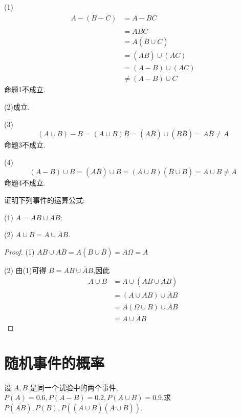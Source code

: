 \begin{solution}
    (1)
    $$
    \begin{aligned}
        A-(B-C) &= A - B \overline{C} \\
        &= A \overline{B \overline{C}} \\
        &= A (\overline{B} \cup C) \\
        &= (A \overline{B}) \cup (AC) \\
        &= (A-B) \cup (AC) \\
        & \not= (A-B) \cup C
    \end{aligned}
    $$
    命题1不成立.

    (2)成立.

    (3)
    $$
    (A \cup B) - B = (A \cup B) \overline{B} = (A \overline{B}) \cup (B \overline{B}) = A \overline{B} \not= A
    $$
    命题3不成立.

    (4)
    $$
    (A - B) \cup B = (A \overline{B}) \cup B = (A \cup B)(\overline{B} \cup B) = A \cup B \not= A
    $$
    命题4不成立.
\end{solution}

\vspace{1em}

\question 证明下列事件的运算公式:

(1) $A = AB \cup A \overline{B}$;

(2) $A \cup B = A \cup \overline{A} B$.

\begin{proof}
    (1) $AB \cup A \overline{B} = A(B \cup \overline{B}) = A \varOmega = A$

    (2) 由(1)可得 $B = AB \cup \overline{A} B$,因此
    $$
    \begin{aligned}
        A \cup B &= A \cup (AB \cup \overline{A} B) \\
        &= (A \cup AB) \cup \overline{A} B \\
        &= A(\varOmega \cup B) \cup \overline{A} B \\
        &= A \cup \overline{A} B
    \end{aligned}
    $$
\end{proof}

\section{随机事件的概率}

\question 设 $A,B$ 是同一个试验中的两个事件, $P(A)=0.6, P(A-B)=0.2, P(A \cup B) = 0.9$.求 $P(\overline{AB}), P(B), P((\overline{A} \cup B)(A \cup \overline{B}))$.

